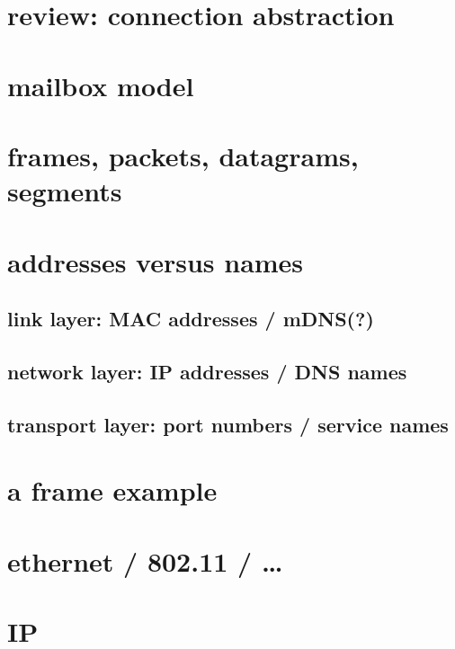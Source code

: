 \date{}
\title{}
\date{}

\begin{frame}
    \titlepage
\end{frame}

\section{review: connection abstraction}

\section{mailbox model}

\section{frames, packets, datagrams, segments}

\section{addresses versus names}

\subsection{link layer: MAC addresses / mDNS(?)}

\subsection{network layer: IP addresses / DNS names}

\subsection{transport layer: port numbers / service names}

\section{a frame example}


\section{ethernet / 802.11 / \ldots}

\section{IP}

